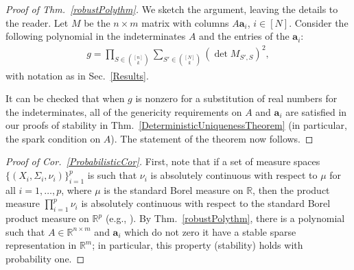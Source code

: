 \documentclass[journal, twocolumn]{IEEEtran}
\newtheorem{lemma}{Lemma}
\begin{document}
\begin{proof}[Proof of Thm.~\ref{robustPolythm}]
We sketch the argument, leaving the details to the reader.
Let $M$ be the $n \times m$ matrix with columns $A\mathbf{a}_i$, $i \in [N]$.  Consider the following polynomial \cite[Sec.~IV]{Hillar15} in the indeterminates $A$ and the entries of the $\mathbf{a}_i$:
\begin{align*}
g = \prod_{S \in {[n] \choose k}} \sum_{S' \in {[N] \choose k}} (\det M_{S',S})^2,
\end{align*}
with notation as in Sec.~\ref{Results}.  

It can be checked that when $g$ is nonzero for a substitution of real numbers for the indeterminates, all of the genericity requirements on $A$ and $\mathbf{a}_i$ are satisfied in our proofs of stability in Thm.~\ref{DeterministicUniquenessTheorem} (in particular, the spark condition on $A$).  The statement of the theorem now follows.
\end{proof}

 \begin{proof}[Proof of Cor.~\ref{ProbabilisticCor}]
First, note that if a set of measure spaces $\{(X_i, \Sigma_i, \nu_i)\}_{i=1}^p$ is such that $\nu_i$ is absolutely continuous with respect to $\mu$ for all $i = 1, \ldots, p$, where $\mu$ is the standard Borel measure on $\mathbb{R}$, then the product measure $\prod_{i=1}^p \nu_i$ is absolutely continuous with respect to the standard Borel product measure on $\mathbb{R}^p$ (e.g.,  \cite{folland2013real}). By Thm.~\ref{robustPolythm}, there is a polynomial such that $A \in \mathbb{R}^{n \times m}$ and $\mathbf{a}_i$ which do not zero it have a stable sparse representation in $\mathbb R^m$; in particular, this property (stability) holds with probability one.
\end{proof}
\end{document}
